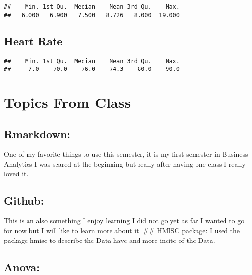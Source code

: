\documentclass[
]{article}
\newenvironment{Shaded}{\begin{snugshade}}{\end{snugshade}}
\newcommand{\FunctionTok}[1]{\textcolor[rgb]{0.00,0.00,0.00}{#1}}
\newcommand{\NormalTok}[1]{#1}
\newcommand{\SpecialCharTok}[1]{\textcolor[rgb]{0.00,0.00,0.00}{#1}}
\begin{document}
\begin{verbatim}
##    Min. 1st Qu.  Median    Mean 3rd Qu.    Max. 
##   6.000   6.900   7.500   8.726   8.000  19.000
\end{verbatim}

\hypertarget{heart-rate}{%
\subsection{Heart Rate}\label{heart-rate}}

\begin{Shaded}
\end{Shaded}

\begin{verbatim}
##    Min. 1st Qu.  Median    Mean 3rd Qu.    Max. 
##     7.0    70.0    76.0    74.3    80.0    90.0
\end{verbatim}

\hypertarget{topics-from-class}{%
\section{Topics From Class}\label{topics-from-class}}

\hypertarget{rmarkdown}{%
\subsection{Rmarkdown:}\label{rmarkdown}}

One of my favorite things to use this semester, it is my first semester
in Business Analytics I was scared at the beginning but really after
having one class I really loved it.

\hypertarget{github}{%
\subsection{Github:}\label{github}}

This is an also something I enjoy learning I did not go yet as far I
wanted to go for now but I will like to learn more about it. \#\# HMISC
package: I used the package hmisc to describe the Data have and more
incite of the Data.

\hypertarget{anova}{%
\subsection{Anova:}\label{anova}}
\end{document}

